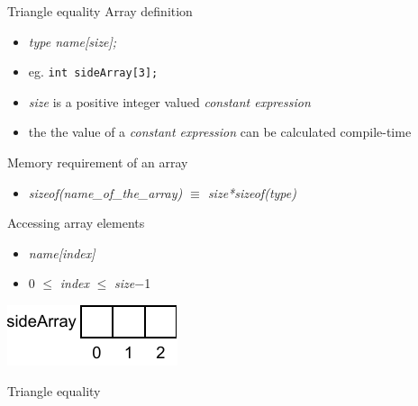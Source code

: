 \documentclass[usenames,dvipsnames,aspectratio=169]{beamer}
\begin{document}
\begin{frame}[fragile]{Triangle equality}
  Array definition
  \begin{itemize}
    \item \emph{type name[size];}
    \item eg. \texttt{int sideArray[3];}
    \item \emph{size} is a positive integer valued \emph{constant expression}
    \item the the value of a \emph{constant expression} can be calculated compile-time
  \end{itemize}
  Memory requirement of an array
  \begin{itemize}
    \item[] \emph{sizeof(name\_of\_the\_array) $\equiv$ size*sizeof(type)}
  \end{itemize}
  Accessing array elements
  \begin{itemize}
    \item \emph{name[index]}
    \item 0 $\leq$ \emph{index} $\leq$ \emph{size}$-$1
  \end{itemize}
  \hspace{4mm}\includegraphics[]{array.pdf}
\end{frame}

\begin{frame}{Triangle equality}
    \begin{exampleblock}{}
    \tiny
    \vspace{-.3cm}
    
    \vspace{-.3cm}
  \end{exampleblock}
\end{frame}
\end{document}
